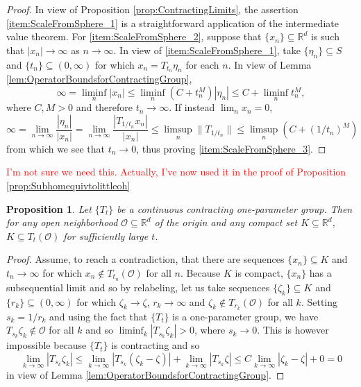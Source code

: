 \documentclass[11pt]{article}
\newtheorem{proposition}[theorem]{Proposition}
\begin{document}
\begin{proof}
In view of Proposition \ref{prop:ContractingLimits}, the assertion \ref{item:ScaleFromSphere_1} is a straightforward application of the intermediate value theorem. For \ref{item:ScaleFromSphere_2}, suppose that $\{x_n\}\subseteq\mathbb{R}^d$ is such that $|x_n|\rightarrow \infty$ as $n\rightarrow\infty$. In view of \ref{item:ScaleFromSphere_1}, take $\{\eta_n\}\subseteq S$ and $\{t_n\}\subseteq (0,\infty)$ for which $x_n=T_{t_n}\eta_n$ for each $n$. In view of Lemma \ref{lem:OperatorBoundsforContractingGroup},
\begin{equation*}
\infty=\liminf_n |x_n|\leq\liminf_n \left(C+t_n^M\right)|\eta_n|\leq C+\liminf_nt_n^M,
\end{equation*}
where $C,M>0$ and therefore $t_n\rightarrow\infty$. If instead $\lim_n x_n=0$,
\begin{equation*}
\infty=\lim_{n\rightarrow\infty}\frac{|\eta_n|}{|x_n|}=\lim_{n\rightarrow\infty}\frac{|T_{1/t_n}x_n|}{|x_n|}\leq\limsup_n\|T_{1/t_n}\|\leq\limsup_n(C+(1/t_n)^M)
\end{equation*}
from which we see that $t_n\rightarrow 0$, thus proving \ref{item:ScaleFromSphere_3}.
\end{proof}

\textcolor{red}{I'm not sure we need this. Actually, I've now used it in the proof of Proposition \ref{prop:Subhomequivtolittleoh}}
\begin{proposition}\label{prop:ContractingCapturesCompact}
Let $\{T_t\}$ be a continuous contracting one-parameter group. Then for any open neighborhood $\mathcal{O}\subseteq\mathbb{R}^d$ of the origin and any compact set $K\subseteq\mathbb{R}^d$, $K\subseteq T_t(\mathcal{O})$ for sufficiently large $t$.
\end{proposition}
\begin{proof}
Assume, to reach a contradiction, that there are sequences $\{x_n\}\subseteq K$ and $t_n\rightarrow\infty$ for which $x_n\notin T_{t_n}(\mathcal{O})$ for all $n$. Because $K$ is compact, $\{x_n\}$ has a subsequential limit and so by relabeling, let us take sequences $\{\zeta_k\}\subseteq K$ and $\{r_k\}\subseteq (0,\infty)$ for which $\zeta_k\rightarrow \zeta$, $r_k\rightarrow\infty$ and $\zeta_k\notin T_{r_k}(\mathcal{O})$ for all $k$. Setting $s_k=1/r_k$ and using the fact that $\{T_t\}$ is a one-parameter group, we have $T_{s_k}\zeta_k\notin\mathcal{O}$ for all $k$ and so $\liminf_{k}|T_{s_k}\zeta_k|>0$, where $s_k\rightarrow 0$. This is however impossible because $\{T_t\}$ is contracting and so
\begin{equation*}
\lim_{k\rightarrow\infty}|T_{s_k}\zeta_k|\leq\lim_{k\rightarrow \infty}|T_{s_k}(\zeta_k-\zeta)|+\lim_{k\rightarrow\infty}|T_{s_k}\zeta|\leq C\lim_{k\rightarrow\infty}|\zeta_k-\zeta|+0=0
\end{equation*}
in view of Lemma \ref{lem:OperatorBoundsforContractingGroup}.
\end{proof}
\end{document}
